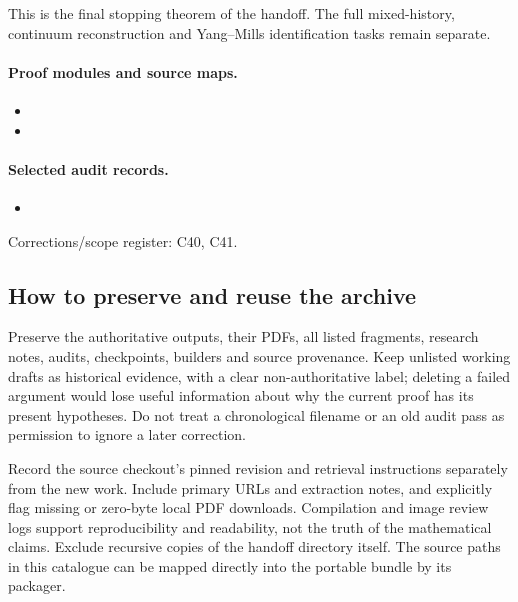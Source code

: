This is the final stopping theorem of the handoff. The full mixed-history, continuum reconstruction and Yang--Mills identification tasks remain separate.

\paragraph{Proof modules and source maps.}
\begingroup\small
\begin{itemize}
\item {}
\item {}
\end{itemize}
\endgroup

\paragraph{Selected audit records.}
\begingroup\small
\begin{itemize}
\item {}
\end{itemize}
\endgroup
Corrections/scope register: C40, C41.\par

\subsection{How to preserve and reuse the archive}
\label{hnc-archive-policy}
Preserve the authoritative outputs, their PDFs, all listed fragments,
research notes, audits, checkpoints, builders and source provenance.
Keep unlisted working drafts as historical evidence, with a clear
non-authoritative label; deleting a failed argument would lose useful
information about why the current proof has its present hypotheses.
Do not treat a chronological filename or an old audit pass as permission
to ignore a later correction.

Record the source checkout's pinned revision and retrieval instructions
separately from the new work. Include primary URLs and extraction notes, and explicitly
flag missing or zero-byte local PDF downloads. Compilation and image
review logs support reproducibility and readability, not the truth of
the mathematical claims. Exclude recursive copies of the handoff
directory itself. The source paths in this catalogue can be mapped
directly into the portable bundle by its packager.

